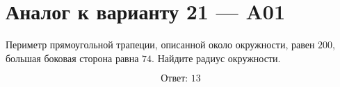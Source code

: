 


\section*{Аналог к варианту 21 — A01}
Периметр прямоугольной трапеции, описанной около окружности, равен \(200\), большая боковая сторона равна \(74\). Найдите радиус окружности.
\begin{center}\end{center}
\[\boxed{\text{Ответ: }13}\]

